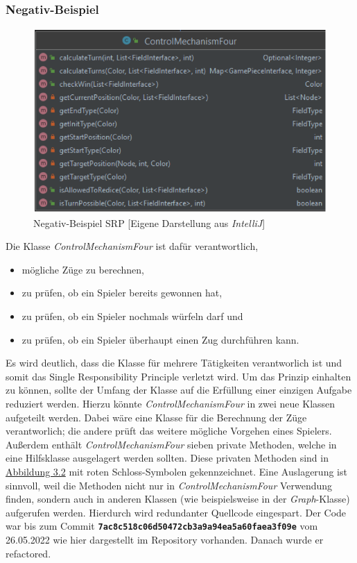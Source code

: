 \newpage
\subsubsection{Negativ-Beispiel}
\begin{figure}[htbp]
\centering
\centerline{\includegraphics[scale=.6]{negativbeispiel_srp_alt}}
\caption{Negativ-Beispiel SRP [Eigene Darstellung aus \emph{IntelliJ}]}
\label{fig:negativbeispiel_srp}
\end{figure}

\noindent Die Klasse \emph{ControlMechanismFour} ist dafür verantwortlich, 
\begin{itemize}
\item mögliche Züge zu berechnen,
\item zu prüfen, ob ein Spieler bereits gewonnen hat,
\item zu prüfen, ob ein Spieler nochmals würfeln darf und
\item zu prüfen, ob ein Spieler überhaupt einen Zug durchführen kann.
\end{itemize}


\noindent Es wird deutlich, dass die Klasse für mehrere Tätigkeiten verantworlich ist und somit das Single Responsibility Principle verletzt wird. Um das Prinzip einhalten zu können, sollte der Umfang der Klasse auf die Erfüllung einer einzigen Aufgabe reduziert werden. Hierzu könnte \emph{ControlMechanismFour} in zwei neue Klassen aufgeteilt werden. Dabei wäre eine Klasse für die Berechnung der Züge verantworlich; die andere prüft das weitere mögliche Vorgehen eines Spielers. Außerdem enthält \emph{ControlMechanismFour} sieben private Methoden, welche in eine Hilfsklasse ausgelagert werden sollten. Diese privaten Methoden sind in \hyperref[fig:negativbeispiel_srp]{Abbildung 3.2} mit roten Schloss-Symbolen gekennzeichnet. Eine Auslagerung ist sinnvoll, weil die Methoden nicht nur in \emph{ControlMechanismFour} Verwendung finden, sondern auch in anderen Klassen (wie beispielsweise in der \emph{Graph}-Klasse) aufgerufen werden. Hierdurch wird redundanter Quellcode eingespart. Der Code war bis zum Commit \textbf{\texttt{7ac8c518c06d50472cb3a9a94ea5a60faea3f09e}} vom 26.05.2022 wie hier dargestellt im Repository vorhanden. Danach wurde er refactored.


